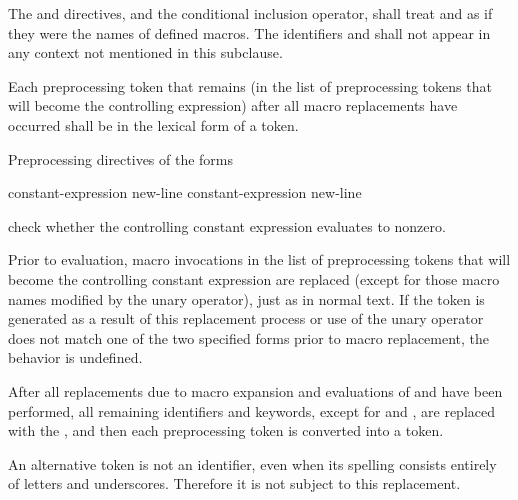\pnum
The  and  directives, and
the  conditional inclusion operator,
shall treat  and 
as if they were the names of defined macros.
The identifiers  and 
shall not appear in any context not mentioned in this subclause.

\pnum
Each preprocessing token that remains (in the list of preprocessing tokens that
will become the controlling expression)
after all macro replacements have occurred
shall be in the lexical form of a token.

\pnum
Preprocessing directives of the forms
\begin{ncsimplebnf}\obeyspaces
{}%
 constant-expression new-line \br
{}%
 constant-expression new-line 
\end{ncsimplebnf}
check whether the controlling constant expression evaluates to nonzero.

\pnum
Prior to evaluation,
macro invocations in the list of preprocessing tokens
that will become the controlling constant expression
are replaced
(except for those macro names modified by the
unary operator),
just as in normal text.
If the token
is generated as a result of this replacement process
or use of the
unary operator does not match one of the two specified forms
prior to macro replacement,
the behavior is undefined.

\pnum
After all replacements due to macro expansion and
evaluations of  and
have been performed,
all remaining identifiers and keywords,
except for
and
,
are replaced with the 
,
and then each preprocessing token is converted into a token.
\begin{note}
An alternative
token is not an identifier,
even when its spelling consists entirely of letters and underscores.
Therefore it is not subject to this replacement.
\end{note}

